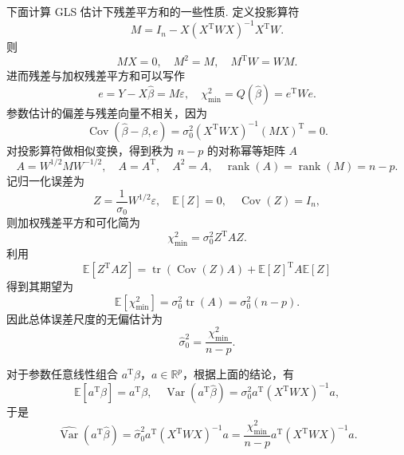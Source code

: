 下面计算 GLS 估计下残差平方和的一些性质.
定义投影算符
\begin{equation*}
	M=I_n-X(X^\mathrm{T}WX)^{-1}X^\mathrm{T}W.
\end{equation*}
则
\begin{equation*}
	MX=0,
	\quad M^2=M,
	\quad M^\mathrm{T}W=WM.
\end{equation*}
进而残差与加权残差平方和可以写作
\begin{equation*}
	e=Y-X\hat{\beta}=M\varepsilon,
	\quad \chi_{\min}^2=Q(\hat{\beta})=e^\mathrm{T}We.
\end{equation*}
参数估计的偏差与残差向量不相关，因为
\begin{equation*}
	\operatorname{Cov}(\hat{\beta}-\beta,e)
	=\sigma_0^2(X^\mathrm{T}WX)^{-1}(MX)^\mathrm{T}=0.
\end{equation*}
对投影算符做相似变换，得到秩为 \(n-p\) 的对称幂等矩阵 \(A\)
\begin{equation*}
	A=W^{1/2}MW^{-1/2},
	\quad A=A^\mathrm{T},\quad A^2=A,
	\quad \operatorname{rank}(A)=\operatorname{rank}(M)=n-p.
\end{equation*}
记归一化误差为
\begin{equation*}
	Z=\frac{1}{\sigma_0}W^{1/2}\varepsilon,
	\quad \mathbb{E}[Z]=0,
	\quad \operatorname{Cov}(Z)=I_n,
\end{equation*}
则加权残差平方和可化简为
\begin{equation*}
	\chi_{\min}^2=\sigma_0^2Z^\mathrm{T}AZ.
\end{equation*}
利用
\begin{equation*}
	\mathbb{E}[Z^\mathrm{T}AZ]
	=\operatorname{tr}(\operatorname{Cov}(Z)A)+\mathbb{E}[Z]^\mathrm{T}A\mathbb{E}[Z]
\end{equation*}
得到其期望为
\begin{equation*}
	\mathbb{E}[\chi_{\min}^2]=\sigma_0^2\operatorname{tr}(A)=\sigma_0^2(n-p).
\end{equation*}
因此总体误差尺度的无偏估计为
\begin{equation*}
	\hat{\sigma}_0^2=\frac{\chi_{\min}^2}{n-p}.
\end{equation*}

对于参数任意线性组合 \(a^\mathrm{T}\beta\)，\(a\in\mathbb{R}^p\)，根据上面的结论，有
\begin{equation*}
	\mathbb{E}[a^\mathrm{T}\hat{\beta}]=a^\mathrm{T}\beta,
	\quad \operatorname{Var}(a^\mathrm{T}\hat{\beta})
	=\sigma_0^2a^\mathrm{T}(X^\mathrm{T}WX)^{-1}a,
\end{equation*}
于是
\begin{equation*}
	\widehat{\operatorname{Var}}(a^\mathrm{T}\hat{\beta})
	=\hat{\sigma}_0^2a^\mathrm{T}(X^\mathrm{T}WX)^{-1}a
	=\frac{\chi_{\min}^2}{n-p}a^\mathrm{T}(X^\mathrm{T}WX)^{-1}a.
\end{equation*}

